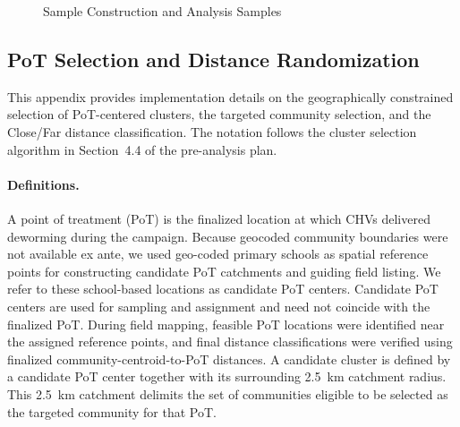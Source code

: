 \documentclass[ECM\space ReStud.tex]{subfiles}
\begin{document}
\begin{landscape}
    \begin{figure}
      \centering
      \caption{Sample Construction and Analysis Samples}
      \label{fig:sample-consort}
    \end{figure}
\end{landscape}

\newpage

\subsection{PoT Selection and Distance Randomization}\label{sec:site-selection}

This appendix provides implementation details on the geographically constrained selection of PoT-centered clusters, the targeted community selection, and the Close/Far distance classification. The notation follows the cluster selection algorithm in Section~4.4 of the pre-analysis plan.

\paragraph{Definitions.}
A point of treatment (PoT) is the finalized location at which CHVs delivered deworming during the campaign. Because geocoded community boundaries were not available ex ante, we used geo-coded primary schools as spatial reference points for constructing candidate PoT catchments and guiding field listing. We refer to these school-based locations as candidate PoT centers. Candidate PoT centers are used for sampling and assignment and need not coincide with the finalized PoT. During field mapping, feasible PoT locations were identified near the assigned reference points, and final distance classifications were verified using finalized community-centroid-to-PoT distances. A candidate cluster is defined by a candidate PoT center together with its surrounding 2.5~km catchment radius. This 2.5~km catchment delimits the set of communities eligible to be selected as the targeted community for that PoT.
\end{document}
